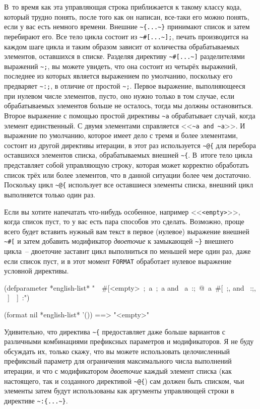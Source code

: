 В~то время как эта управляющая строка приближается к такому классу кода, который трудно понять, после того как
он написан, все-таки его можно понять, если у вас есть немного времени. Внешние
\lstinline!~{...~}! принимают список и затем перебирают его. Все тело цикла состоит из \lstinline!~#[...~];!, печать
производится на каждом шаге цикла и таким образом зависит от количества обрабатываемых элементов, оставшихся в
списке. Разделяя директиву \lstinline!~#[...~]! разделителями выражений \lstinline!~;!, вы можете увидеть, что она состоит из
четырёх выражений, последнее из которых является выражением по умолчанию, поскольку его предваряет \lstinline!~:;!, в
отличие от простой \lstinline!~;!. Первое выражение, выполняющееся при нулевом числе элементов, пусто, оно нужно только
в том случае, если обрабатываемых элементов больше не осталось, тогда мы должны остановиться. Второе выражение с
помощью простой директивы \lstinline!~a! обрабатывает случай, когда элемент единственный. С двумя элементами справляется
<<\lstinline!~a and ~a!>>. И выражение по умолчанию, которое имеет дело с тремя и более элементами, состоит из другой
директивы итерации, в этот раз используется \lstinline!~@{! для перебора оставшихся элементов списка, обрабатываемых внешней
\lstinline!~{!. В~итоге тело цикла представляет собой управляющую строку, которая может корректно обработать список трёх
или более элементов, что в данной ситуации более чем достаточно. Поскольку цикл \lstinline!~@{! использует все
оставшиеся элементы списка, внешний цикл выполняется только один раз.

Если вы хотите напечатать что-нибудь особенное, например <<\lstinline!<empty>!>>, когда
список пуст, то у вас есть пара способов это сделать. Возможно, проще всего будет вставить
нужный вам текст в первое (нулевое) выражение внешней \lstinline!~#[! и затем добавить
модификатор \textit{двоеточие} к замыкающей \lstinline!~}! внешнего цикла~-- двоеточие
заставит цикл выполниться по меньшей мере один раз, даже если список пуст, и в этот момент
\lstinline{FORMAT} обработает нулевое выражение условной директивы.

\begin{myverb}
(defparameter *english-list*
  "~{~#[<empty>~;~a~;~a and ~a~:;~@{~a~#[~;, and ~:;, ~]~}~]~:}")

(format nil *english-list* '()) ==> "<empty>"
\end{myverb}

Удивительно, что директива \lstinline!~{! предоставляет даже больше вариантов с различными комбинациями префиксных
параметров и модификаторов. Я не буду обсуждать их, только скажу, что вы можете использовать целочисленный
префиксный параметр для ограничения максимального числа выполнений итерации, и что с модификатором \textit{двоеточие}
каждый элемент списка (как настоящего, так и созданного директивой \lstinline!~@{!) сам должен быть списком, чьи
элементы затем будут использованы как аргументы управляющей строки в директиве \lstinline!~:{...~}!.

